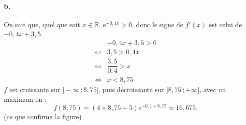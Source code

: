 \documentclass[10pt]{article}
\providecommand{\e}{{\mathrm{e}}}
\begin{document}
\paragraph{b.} On sait que, quel que soit \( x \in \mathbb{R} \), \( \e^{-0{,}1x} > 0 \), donc le signe de \( f'(x) \) est celui de \( -0{,}4x + 3{,}5 \).
\begin{align*}
&-0{,}4x + 3{,}5 > 0  \\
\iff &3{,}5 > 0{,}4x \\
\iff &\dfrac{3{,}5}{0{,}4} > x \\
\iff &x < 8{,}75
\end{align*}
\( f \) est croissante sur \( ] -\infty \,; 8{,}75[ \), puis décroissante sur \( ]8{,}75 \,; +\infty[ \), avec un maximum en :
\[
f(8{,}75) = (4 \times 8{,}75 + 5)\e^{-0{,}1 \times 8{,}75} \approx 16{,}675.
\]
(ce que confirme la figure)
\end{document}
